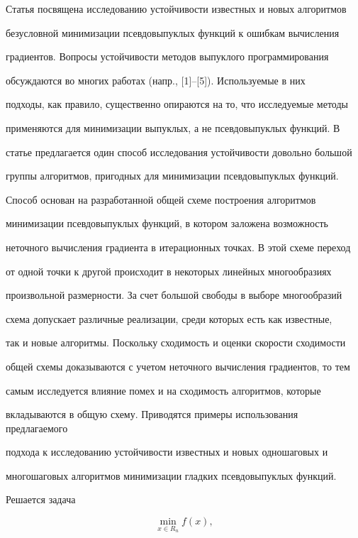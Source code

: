 \label{begin}





Статья посвящена исследованию устойчивости известных и новых алгоритмов


безусловной минимизации псевдовыпуклых функций к ошибкам вычисления


градиентов. Вопросы устойчивости методов выпуклого программирования


обсуждаются во многих работах (напр., [1]--[5]). Используемые в них


подходы, как правило, существенно опираются на то, что исследуемые методы


применяются для минимизации выпуклых, а не псевдовыпуклых функций. В


статье предлагается один способ исследования устойчивости довольно большой


группы алгоритмов, пригодных для минимизации псевдовыпуклых функций.


Способ основан на разработанной общей схеме построения алгоритмов


минимизации псевдовыпуклых функций, в котором заложена возможность


неточного вычисления градиента в итерационных точках. В этой схеме переход


от одной точки к другой происходит в некоторых линейных многообразиях


произвольной размерности. За счет большой свободы в выборе многообразий


схема допускает различные реализации, среди которых есть как известные,


так и новые алгоритмы. Поскольку сходимость и оценки скорости сходимости


общей схемы доказываются с учетом неточного вычисления градиентов, то тем


самым исследуется влияние помех и на сходимость алгоритмов, которые


вкладываются в общую схему. Приводятся примеры использования предлагаемого


подхода к исследованию устойчивости известных и новых одношаговых и


многошаговых алгоритмов минимизации гладких псевдовыпуклых функций.





Решается задача


\begin{equation}


\min \limits _{x\in R_n}f(x),


\end{equation}


